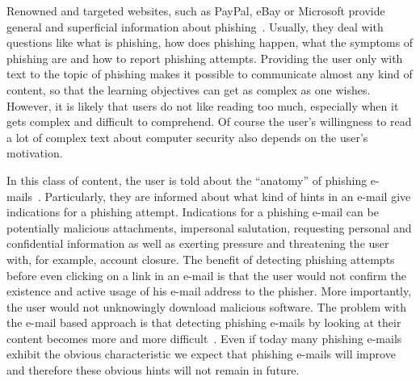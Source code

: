 \begin{description}[leftmargin=0cm]
	\item[General Knowledge Transfer] Renowned and targeted websites, such as PayPal, eBay or Microsoft provide general and superficial information about phishing~\cite{generalknowledgemicrosoft, generalknowledgepaypal, generalknowledgeebay}.
	Usually, they deal with questions like what is phishing, how does phishing happen, what the symptoms of phishing are and how to report phishing attempts.
 Providing the user only with text to the topic of phishing makes it possible to communicate almost any kind of content, so that the learning objectives can get as complex as one wishes.
 However, it is likely that users do not like reading too much, especially when it gets complex and difficult to comprehend.
 Of course the user's willingness to read a lot of complex text about computer security also depends on the user's motivation. 
	\item[E-Mail Based Knowledge] In this class of content, the user is told about the ``anatomy'' of phishing e-mails~\cite{antiphishingphyllis, sonicwall}. Particularly, they are informed about what kind of hints in an e-mail give indications for a phishing attempt.
 Indications for a phishing e-mail can be potentially malicious  attachments, impersonal salutation, requesting personal and confidential information as well as exerting pressure and threatening the user with, for example, account closure.
 The benefit of detecting phishing attempts before even clicking on a link in an e-mail is that the user would not confirm the existence and active usage of his e-mail address to the phisher.
 More importantly, the user would not unknowingly download malicious software.
 The problem with the e-mail based approach is that detecting phishing e-mails by looking at their content becomes more and more difficult~\cite{microsoftphishing,spamfighter}. Even if today  many phishing e-mails exhibit the obvious characteristic we expect that phishing e-mails will improve and therefore these obvious hints will not remain in future. 


\end{description}
